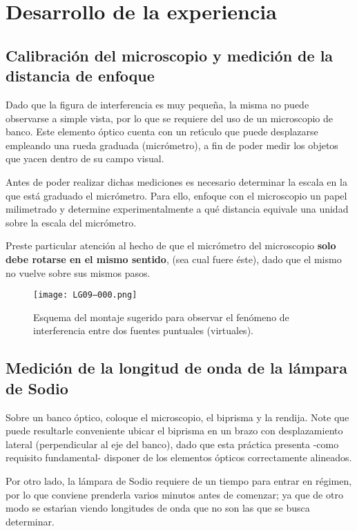 \documentclass[laboratorio]{guia}
\begin{document}
\section{Desarrollo de la experiencia}

\subsection{Calibraci\'on del microscopio y medici\'on de la distancia de
enfoque}

Dado que la figura de interferencia es muy peque\~na, la misma no puede
observarse a simple vista, por lo que se requiere del uso de un microscopio de
banco. Este elemento \'optico cuenta con un ret\'\i culo que puede desplazarse
empleando una rueda graduada (micr\'ometro), a fin de poder medir los objetos
que yacen dentro de su campo visual.

Antes de poder realizar dichas mediciones es necesario determinar la escala en
la que est\'a graduado el micr\'ometro. Para ello, enfoque con el microscopio
un papel milimetrado y determine experimentalmente a qu\'e distancia equivale
una unidad sobre la escala del micr\'ometro.

Preste particular atenci\'on al hecho de que el micr\'ometro del microscopio
{\bf solo debe rotarse en el mismo sentido}, (sea cual fuere \'este), dado que
el mismo no vuelve sobre sus mismos pasos. 

\begin{figure}[t!]
    \centering
    \texttt{[image: LG09--000.png]}
    \caption{Esquema del montaje sugerido para observar el fen\'omeno de
    interferencia entre dos fuentes puntuales (virtuales).}
    \label{fig:1}
\end{figure}



\subsection{Medici\'on de la longitud de onda de la l\'ampara de Sodio}

Sobre un banco \'optico, coloque el microscopio, el biprisma y la rendija. Note
que puede resultarle conveniente 
ubicar el biprisma en un brazo con desplazamiento lateral
(perpendicular al eje del banco), dado que esta pr\'actica presenta -como
requisito fundamental- disponer de los elementos \'opticos correctamente
alineados. 

Por otro lado, la l\'ampara de Sodio requiere de un tiempo para entrar en
r\'egimen, por lo que conviene prenderla varios minutos antes de comenzar; ya
que de otro modo se estar\'\i an viendo longitudes de onda que no son las que
se busca determinar.
\end{document}

